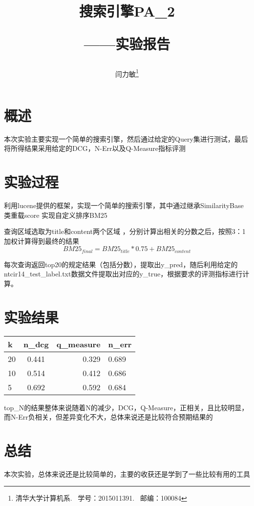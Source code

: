 \documentclass{article}
\begin{document}
\title{搜索引擎PA\_2 \\[1ex]\begin{Large}——实验报告\end{Large}}
\author{闫力敏\thanks{清华大学计算机系.~ 学号：2015011391.~ 邮编：100084}}
\date{}

	\maketitle

	\section{概述}
		本次实验主要实现一个简单的搜索引擎，然后通过给定的Query集进行测试，最后将所得结果采用给定的DCG，N-Err以及Q-Measure指标评测
	\section{实验过程}
		利用lucene提供的框架，实现一个简单的搜索引擎，其中通过继承SimilarityBase类重载score 实现自定义排序BM25
		\par
		查询区域选取为title和content两个区域	，分别计算出相关的分数之后，按照3：1加权计算得到最终的结果
		$$BM25_{final} = BM25_{title} * 0.75 + BM25_{content} $$
		\par
		每次查询返回top20的规定结果（包括分数），提取出y\_pred，随后利用给定的ntcir14\_test\_label.txt数据文件提取出对应的y\_true，根据要求的评测指标进行计算。
	\section{实验结果}
		\begin{tabular}{|l|c|r|l|} 
		\hline 
		k &n\_dcg&q\_measure&n\_err\\
		\hline 
		20 &0.441 &0.329& 0.689\\
		10 &0.514 &0.412& 0.686\\
		5 &0.692 &0.592& 0.684\\
		\hline 
		\end{tabular}
		\par 
		top\_N的结果整体来说随着N的减少，DCG，Q-Measure，正相关，且比较明显，而N-Err负相关，但差异变化不大，总体来说还是比较符合预期结果的

	\section{总结}
		本次实验，总体来说还是比较简单的，主要的收获还是学到了一些比较有用的工具
	
	
\end{document}
